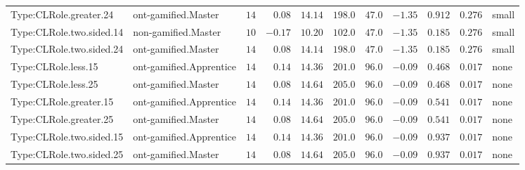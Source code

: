 \documentclass[6pt,a4paper]{article}
\begin{document}
{\begin{longtable}{llrrrrrrrrl}
Type:CLRole.greater.24&ont-gamified.Master&$14$&$ 0.08$&$14.14$&$198.0$&$ 47.0$&$-1.35$&$0.912$&$0.276$&small\tabularnewline
Type:CLRole.two.sided.14&non-gamified.Master&$10$&$-0.17$&$10.20$&$102.0$&$ 47.0$&$-1.35$&$0.185$&$0.276$&small\tabularnewline
Type:CLRole.two.sided.24&ont-gamified.Master&$14$&$ 0.08$&$14.14$&$198.0$&$ 47.0$&$-1.35$&$0.185$&$0.276$&small\tabularnewline
Type:CLRole.less.15&ont-gamified.Apprentice&$14$&$ 0.14$&$14.36$&$201.0$&$ 96.0$&$-0.09$&$0.468$&$0.017$&none\tabularnewline
Type:CLRole.less.25&ont-gamified.Master&$14$&$ 0.08$&$14.64$&$205.0$&$ 96.0$&$-0.09$&$0.468$&$0.017$&none\tabularnewline
Type:CLRole.greater.15&ont-gamified.Apprentice&$14$&$ 0.14$&$14.36$&$201.0$&$ 96.0$&$-0.09$&$0.541$&$0.017$&none\tabularnewline
Type:CLRole.greater.25&ont-gamified.Master&$14$&$ 0.08$&$14.64$&$205.0$&$ 96.0$&$-0.09$&$0.541$&$0.017$&none\tabularnewline
\newpage
Type:CLRole.two.sided.15&ont-gamified.Apprentice&$14$&$ 0.14$&$14.36$&$201.0$&$ 96.0$&$-0.09$&$0.937$&$0.017$&none\tabularnewline
Type:CLRole.two.sided.25&ont-gamified.Master&$14$&$ 0.08$&$14.64$&$205.0$&$ 96.0$&$-0.09$&$0.937$&$0.017$&none\tabularnewline
\hline
\end{longtable}}
\end{document}
